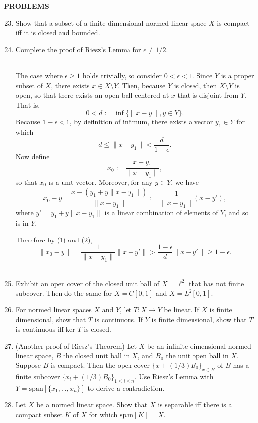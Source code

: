 \begin{center}
	\textbf{PROBLEMS}
\end{center}
\begin{enumerate}
	\setcounter{enumi}{22}
    \item Show that a subset of a finite dimensional normed linear space $X$ is compact iff it is closed and bounded.
    \\\item Complete the proof of Riesz's Lemma for $\epsilon\neq1/2$.
    
    \ \\The case where $\epsilon\ge1$ holds trivially, so consider $0<\epsilon<1$.
    Since $Y$ is a proper subset of $X$, there exists $x\in X\setminus Y$.
    Then, because $Y$ is closed, then $X\setminus Y$ is open, so that there exists an open ball centered at $x$ that is disjoint from $Y$.
    That is, 
    \[
        0<d:=\inf\{\|x-y\|, y\in Y\}.\tag{1}
    \]
    Because $1-\epsilon<1$, by definition of infimum, there exists a vector $y_1\in Y$ for which 
    \[
        d\le\|x-y_1\|<\frac{d}{1-\epsilon}.\tag{2}
    \]
    Now define 
    \[
        x_0:=\frac{x-y_1}{\|x-y_1\|},
    \]
    so that $x_0$ is a unit vector.
    Moreover, for any $y\in Y$, we have
    \[
        x_0-y=\frac{x-(y_1+y\|x-y_1\|)}{\|x-y_1\|}:=\frac{1}{\|x-y_1\|}(x-y'),
    \] 
    where $y'=y_1+y\|x-y_1\|$ is a linear combination of elements of $Y$, and so is in $Y$.
    
    Therefore by (1) and (2),
    \[
        \|x_0-y\|=\frac{1}{\|x-y_1\|}\|x-y'\|>\frac{1-\epsilon}{d}\|x-y'\|\ge1-\epsilon.
    \]
    \\\item Exhibit an open cover of the closed unit ball of $X=\ell^2$ that has not finite subcover.
    Then do the same for $X=C[0,1]$ and $X=L^2[0,1]$.
    \\\item For normed linear spaces $X$ and $Y$, let $T:X\to Y$ be linear.
    If $X$ is finite dimensional, show that $T$ is continuous. 
    If $Y$ is finite dimensional, show that $T$ is continuous iff $\text{ker }T$ is closed.
    \\\item (Another proof of Riesz's Theorem) Let $X$ be an infinite dimensional normed linear space, $B$ the closed unit ball in $X$, and $B_0$ the unit open ball in $X$.
    Suppose $B$ is compact.
    Then the open cover $\{x+(1/3)B_0\}_{x\in B}$ of $B$ has a finite subcover $\{x_i+(1/3)B_0\}_{1\le i\le n}$.
    Use Riesz's Lemma with $Y=\text{span}[\{x_1,\dots,x_n\}]$ to derive a contradiction.
    \\\item Let $X$ be a normed linear space.
    Show that $X$ is separable iff there is a compact subset $K$ of $X$ for which $\overline{\text{span}}[K]=X$.
\end{enumerate}

